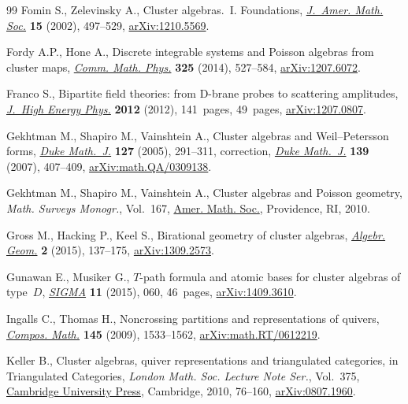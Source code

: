 \documentclass[pdftex]{sigma}
\numberwithin{equation}{section}
\begin{document}
\begin{thebibliography}{99}
Fomin S., Zelevinsky A., Cluster algebras.~{I}. {F}oundations, \href{https://doi.org/10.1090/S0894-0347-01-00385-X}{\textit{J.~Amer.
 Math. Soc.}} \textbf{15} (2002), 497--529, \href{https://arxiv.org/abs/1210.5569}{arXiv:1210.5569}.

Fordy A.P., Hone A., Discrete integrable systems and {P}oisson algebras from
 cluster maps, \href{https://doi.org/10.1007/s00220-013-1867-y}{\textit{Comm. Math. Phys.}} \textbf{325} (2014), 527--584,
 \href{https://arxiv.org/abs/1207.6072}{arXiv:1207.6072}.

Franco S., Bipartite field theories: from {D}-brane probes to scattering
 amplitudes, \href{https://doi.org/10.1007/JHEP11(2012)141}{\textit{J.~High Energy Phys.}} \textbf{2012} (2012), 141~pages,
 49~pages, \href{https://arxiv.org/abs/1207.0807}{arXiv:1207.0807}.

Gekhtman M., Shapiro M., Vainshtein A., Cluster algebras and
 {W}eil--{P}etersson forms, \href{https://doi.org/10.1215/S0012-7094-04-12723-X}{\textit{Duke Math.~J.}} \textbf{127} (2005),
 291--311, correction,
 \href{https://doi.org/10.1215/S0012-7094-07-13925-5}{\textit{Duke Math.~J.}}
 \textbf{139} (2007), 407--409, \href{https://arxiv.org/abs/math.QA/0309138}{arXiv:math.QA/0309138}.

Gekhtman M., Shapiro M., Vainshtein A., Cluster algebras and {P}oisson
 geometry, \textit{Math. Surveys Monogr.}, Vol.~167, \href{https://doi.org/10.1090/surv/167}{Amer. Math. Soc.},
 Providence, RI, 2010.

Gross M., Hacking P., Keel S., Birational geometry of cluster algebras,
 \href{https://doi.org/10.14231/AG-2015-007}{\textit{Algebr. Geom.}} \textbf{2} (2015), 137--175, \href{https://arxiv.org/abs/1309.2573}{arXiv:1309.2573}.

Gunawan E., Musiker G., {$T$}-path formula and atomic bases for cluster
 algebras of type~{$D$}, \href{https://doi.org/10.3842/SIGMA.2015.060}{\textit{SIGMA}} \textbf{11} (2015), 060, 46~pages,
 \href{https://arxiv.org/abs/1409.3610}{arXiv:1409.3610}.

Ingalls C., Thomas H., Noncrossing partitions and representations of quivers,
 \href{https://doi.org/10.1112/S0010437X09004023}{\textit{Compos. Math.}} \textbf{145} (2009), 1533--1562,
 \href{https://arxiv.org/abs/math.RT/0612219}{arXiv:math.RT/0612219}.

Keller B., Cluster algebras, quiver representations and triangulated
 categories, in Triangulated Categories, \textit{London Math. Soc. Lecture
 Note Ser.}, Vol.~375, \href{https://doi.org/10.1017/CBO9781139107075.004}{Cambridge University Press}, Cambridge, 2010, 76--160,
 \href{https://arxiv.org/abs/0807.1960}{arXiv:0807.1960}.


\end{thebibliography}
\end{document}
